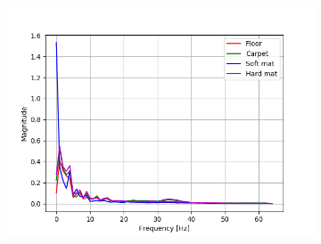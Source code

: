 \documentclass[USenglish]{ifimaster}  %
\begin{document}
\begin{figure}[h]
	\centering
	\begin{subfigure}[b]{0.95\textwidth}
		\includegraphics[width=1\linewidth]{Figures/fftx}
		\caption{}
		\label{fig:fftx} 
	\end{subfigure}
\end{figure}
\end{document}
